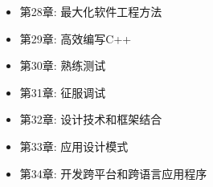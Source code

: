 \begin{itemize}
\item
第28章: 最大化软件工程方法

\item
第29章: 高效编写C++

\item
第30章: 熟练测试

\item
第31章: 征服调试

\item
第32章: 设计技术和框架结合

\item
第33章: 应用设计模式

\item
第34章: 开发跨平台和跨语言应用程序
\end{itemize}